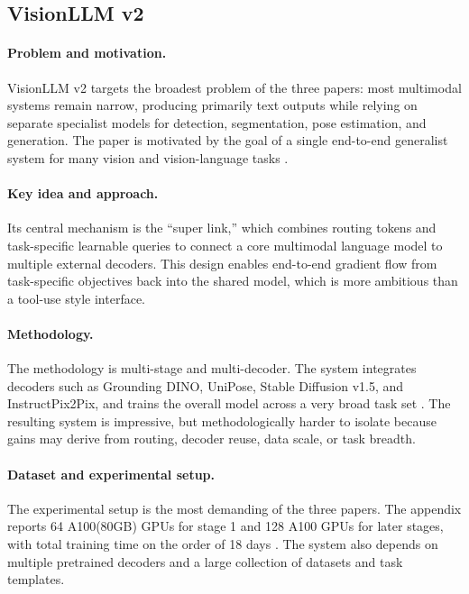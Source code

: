 \documentclass[11pt]{article}
\begin{document}
\subsection{VisionLLM v2}
\paragraph{Problem and motivation.}
VisionLLM v2 targets the broadest problem of the three papers: most multimodal systems
remain narrow, producing primarily text outputs while relying on separate specialist
models for detection, segmentation, pose estimation, and generation. The paper is
motivated by the goal of a single end-to-end generalist system for many vision and
vision-language tasks \citep{wu2024visionllmv2}.

\paragraph{Key idea and approach.}
Its central mechanism is the ``super link,'' which combines routing tokens and
task-specific learnable queries to connect a core multimodal language model to multiple
external decoders. This design enables end-to-end gradient flow from task-specific
objectives back into the shared model, which is more ambitious than a tool-use style
interface.

\paragraph{Methodology.}
The methodology is multi-stage and multi-decoder. The system integrates decoders such
as Grounding DINO, UniPose, Stable Diffusion v1.5, and InstructPix2Pix, and trains the
overall model across a very broad task set \citep{wu2024visionllmv2}. The resulting
system is impressive, but methodologically harder to isolate because gains may derive
from routing, decoder reuse, data scale, or task breadth.

\paragraph{Dataset and experimental setup.}
The experimental setup is the most demanding of the three papers. The appendix reports
64 A100(80GB) GPUs for stage 1 and 128 A100 GPUs for later stages, with total training
time on the order of 18 days \citep{wu2024visionllmv2}. The system also depends on
multiple pretrained decoders and a large collection of datasets and task templates.
\end{document}
